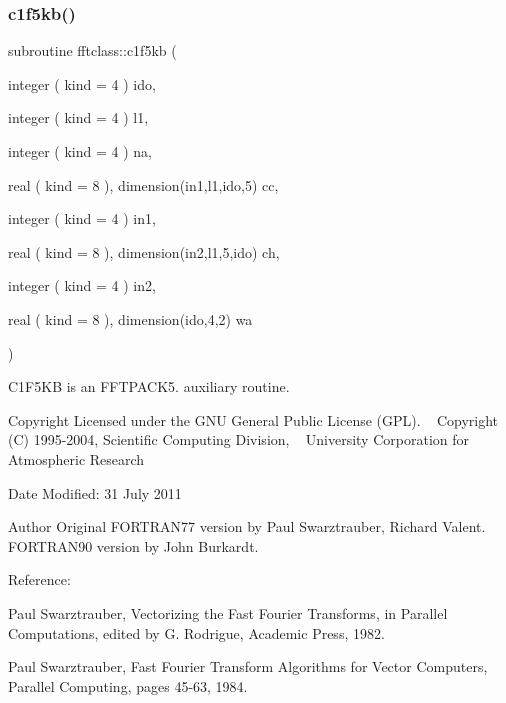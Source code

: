 \subsubsection{\texorpdfstring{c1f5kb()}{c1f5kb()}}
{\footnotesize\ttfamily subroutine fftclass\+::c1f5kb (\begin{DoxyParamCaption}\item[{integer ( kind = 4 )}]{ido,  }\item[{integer ( kind = 4 )}]{l1,  }\item[{integer ( kind = 4 )}]{na,  }\item[{real ( kind = 8 ), dimension(in1,l1,ido,5)}]{cc,  }\item[{integer ( kind = 4 )}]{in1,  }\item[{real ( kind = 8 ), dimension(in2,l1,5,ido)}]{ch,  }\item[{integer ( kind = 4 )}]{in2,  }\item[{real ( kind = 8 ), dimension(ido,4,2)}]{wa }\end{DoxyParamCaption})}



C1\+F5\+KB is an F\+F\+T\+P\+A\+C\+K5. auxiliary routine. 

\begin{DoxyCopyright}{Copyright}
Licensed under the G\+NU General Public License (G\+PL). ~\newline
 Copyright (C) 1995-\/2004, Scientific Computing Division, ~\newline
 University Corporation for Atmospheric Research 
\end{DoxyCopyright}
\begin{DoxyDate}{Date}
Modified\+: 31 July 2011 
\end{DoxyDate}
\begin{DoxyAuthor}{Author}
Original F\+O\+R\+T\+R\+A\+N77 version by Paul Swarztrauber, Richard Valent. ~\newline
 F\+O\+R\+T\+R\+A\+N90 version by John Burkardt.
\end{DoxyAuthor}
\begin{DoxyVerb}  Reference:

    Paul Swarztrauber,
    Vectorizing the Fast Fourier Transforms,
    in Parallel Computations,
    edited by G. Rodrigue,
    Academic Press, 1982.

    Paul Swarztrauber,
    Fast Fourier Transform Algorithms for Vector Computers,
    Parallel Computing, pages 45-63, 1984.\end{DoxyVerb}
 
